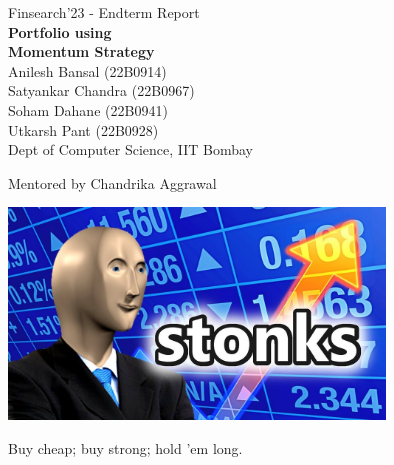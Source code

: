 \documentclass[a4paper]{article}
\begin{document}

\begin{titlepage}
    \vspace*{\fill}
    \begin{center}
        \Large Finsearch'23 - Endterm Report \\[0.5cm]
        \fontsize{40pt}{40pt}\selectfont\textbf{Portfolio using \\ Momentum Strategy} \\[1cm]
        {\Large Anilesh Bansal (22B0914) \\ Satyankar Chandra (22B0967) \\ Soham Dahane (22B0941) \\ Utkarsh Pant (22B0928)\\ Dept of Computer Science, IIT Bombay}\\
    \end{center}
    \vspace*{\fill}
    \begin{center}
        \Large Mentored by Chandrika Aggrawal
    \end{center}
\end{titlepage}

\thispagestyle{empty}

\clearpage

\begin{titlepage}
    \vspace*{\fill}
    \begin{center}
        \includegraphics[width = 10cm]{stonks.jpeg}
    \end{center}
    \vspace{40pt}
    \begin{center}
        \fontsize{25pt}{25pt}\selectfont Buy cheap; buy strong; hold 'em long.
    \end{center}
    \vspace*{\fill}
\end{titlepage}
\end{document}

